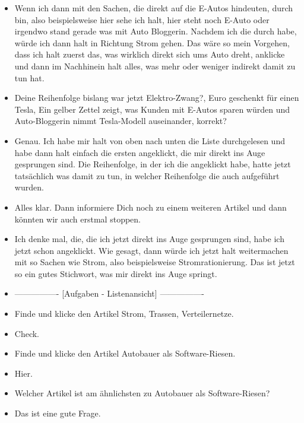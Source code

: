 {\begin{itemize}[]
        \item {} Wenn ich dann mit den Sachen, die direkt auf die E-Autos hindeuten, durch bin, also beispielsweise hier sehe ich halt, hier steht noch E-Auto oder irgendwo stand gerade was mit Auto Bloggerin.
              Nachdem ich die durch habe, würde ich dann halt in Richtung Strom gehen.
              Das wäre so mein Vorgehen, dass ich halt zuerst das, was wirklich direkt sich ums Auto dreht, anklicke und dann im Nachhinein halt alles, was mehr oder weniger indirekt damit zu tun hat.
        \item {} Deine Reihenfolge bislang war jetzt \flqq Elektro-Zwang?\frqq{},  Euro geschenkt für einen Tesla\frqq{}, \flqq Ein gelber Zettel zeigt, was Kunden mit E-Autos sparen würden\frqq{} und \flqq Auto-Bloggerin nimmt Tesla-Modell auseinander\frqq{}, korrekt?
        \item {} Genau.
              Ich habe mir halt von oben nach unten die Liste durchgelesen und habe dann halt einfach die ersten angeklickt, die mir direkt ins Auge gesprungen sind.
              Die Reihenfolge, in der ich die angeklickt habe, hatte jetzt tatsächlich was damit zu tun, in welcher Reihenfolge die auch aufgeführt wurden.
        \item {} Alles klar. Dann informiere Dich noch zu einem weiteren Artikel und dann könnten wir auch erstmal stoppen.
        \item {} Ich denke mal, die, die ich jetzt direkt ins Auge gesprungen sind, habe ich jetzt schon angeklickt.
              Wie gesagt, dann würde ich jetzt halt weitermachen mit so Sachen wie Strom, also beispielsweise \flqq Stromrationierung\frqq{}.
              Das ist jetzt so ein gutes Stichwort, was mir direkt ins Auge springt.
        \item {----------------} [Aufgaben - Listenansicht] {----------------}
        \item {} Finde und klicke den Artikel \flqq Strom, Trassen, Verteilernetze\frqq{}.
        \item {} Check.
        \item {} Finde und klicke den Artikel \flqq Autobauer als Software-Riesen\frqq{}.
        \item {} Hier.
        \item {} Welcher Artikel ist am ähnlichsten zu \flqq Autobauer als Software-Riesen\frqq{}?
        \item {} Das ist eine gute Frage.

\end{itemize}}
